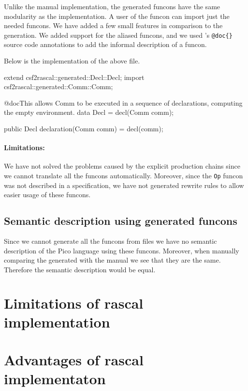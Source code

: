 \documentclass[a4paper, oneside, notitlepage]{article}
\newcommand{\CSF}{\textsmaller{CSF}\xspace}
\newcommand{\ASFSDF}{\textsmaller{ASF\hspace{-.05em}\raisebox{.4ex}{\tiny\bf +}SDF}\xspace}
\newcommand{\ADT}{\textsmaller{ADT}\xspace}
\newcommand{\code}[1]{\texttt{#1}\xspace}
\begin{document}
	Unlike the manual implementation, the generated funcons have the same
	modularity as the \ASFSDF implementation.
	A user of the funcon can import just the needed funcons.
	We have added a few small features in comparison to the \ASFSDF generation.
	We added support for the aliased funcons, and we used \Rascal's
	\code{@doc\{\}} source code annotations to add the informal description of a
	funcon.

	Below is the \Rascal implementation of the above \CSF file.

\begin{rascal}
extend csf2rascal::generated::Decl::Decl;
import csf2rascal::generated::Comm::Comm;
 
@doc{This allows Comm to be executed in a sequence of declarations, computing the
 empty environment.}
data Decl = decl(Comm comm);

public Decl declaration(Comm comm) = 
	decl(comm);
\end{rascal}
	
	\paragraph{Limitations:}
	We have not solved the problems caused by the explicit production chains
	since we cannot translate all the funcons automatically.
	Moreover, since the \code{Op} funcon was not described in a \CSF
	specification, we have not generated rewrite rules to allow easier usage of
	these funcons.

	\subsection{Semantic description using generated funcons}
	Since we cannot generate all the funcons from \CSF files we have no semantic
	description of the Pico language using these funcons.
	Moreover, when manually comparing the generated \ADT with the manual \ADT we
	see that they are the same.
	Therefore the semantic description would be equal.

\section{Limitations of rascal implementation}

\section{Advantages of rascal implementaton}
\end{document}
